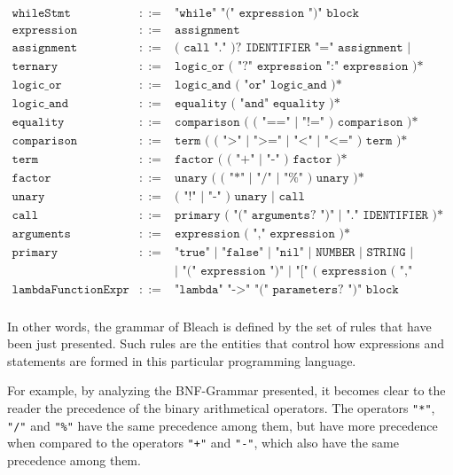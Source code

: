{\[\begin{array}{rcl}
\texttt{whileStmt} & ::= & \texttt{"while" "(" expression ")" block} \\[1pt]
\texttt{expression} & ::= & \texttt{assignment} \\[1pt]
\texttt{assignment} & ::= & \texttt{( call "." )? IDENTIFIER "=" assignment | ternary} \\[1pt]
\texttt{ternary} & ::= & \texttt{logic\_or ( "?" expression ":" expression )*} \\[1pt]
\texttt{logic\_or} & ::= & \texttt{logic\_and ( "or" logic\_and )*} \\[1pt]
\texttt{logic\_and} & ::= & \texttt{equality ( "and" equality )*} \\[1pt]
\texttt{equality} & ::= & \texttt{comparison ( ( "==" | "!=" ) comparison )*} \\[1pt]
\texttt{comparison} & ::= & \texttt{term ( ( ">" | ">=" | "<" | "<=" ) term )*} \\[1pt]
\texttt{term} & ::= & \texttt{factor ( ( "+" | "-" ) factor )*} \\[1pt]
\texttt{factor} & ::= & \texttt{unary ( ( "*" | "/" | "\%" ) unary )*} \\[1pt]
\texttt{unary} & ::= & \texttt{( "!" | "-" ) unary | call} \\[1pt]
\texttt{call} & ::= & \texttt{primary ( "(" arguments? ")" | "." IDENTIFIER )*} \\[1pt]
\texttt{arguments} & ::= & \texttt{expression ( "," expression )*} \\[1pt]
\texttt{primary} & ::= & \texttt{"true" | "false" | "nil" | NUMBER | STRING | IDENTIFIER | "super" "." IDENTIFIER }  \\[1pt]
\texttt{} &  & \texttt{| "(" expression ")" | "[" ( expression ( "," expression )* )? "]"} \\[1pt]
\texttt{lambdaFunctionExpr} & ::= & \texttt{"lambda" "->"  "(" parameters? ")" block} \\[1pt]
\end{array}
\]
}

\newpage

In other words, the grammar of Bleach is defined by the set of rules that have been just presented. Such rules are the entities that control how expressions and statements are formed in this particular programming language.

For example, by analyzing the BNF-Grammar presented, it becomes clear to the reader the precedence of the binary arithmetical operators. The operators \texttt{"*"}, \texttt{"/"} and \texttt{"\%"} have the same precedence among them, but have more precedence when compared to the operators \texttt{"+"} and \texttt{"-"}, which also have the same precedence among them.

